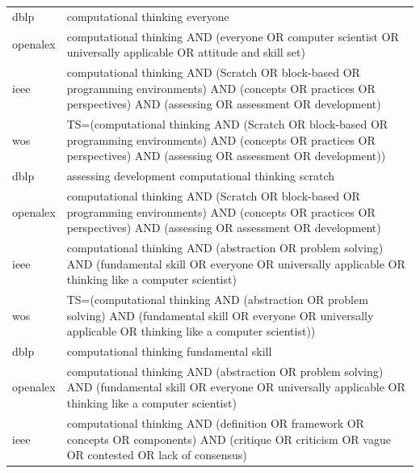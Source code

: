 \documentclass{article}
\begin{document}
\begin{longtable}{lp{10cm}}
dblp & computational thinking everyone \\
openalex & \textquotedbl{}computational thinking\textquotedbl{} AND (everyone OR \textquotedbl{}computer scientist\textquotedbl{} OR \textquotedbl{}universally applicable\textquotedbl{} OR \textquotedbl{}attitude and skill set\textquotedbl{}) \\
ieee & \textquotedbl{}computational thinking\textquotedbl{} AND (Scratch OR \textquotedbl{}block-based\textquotedbl{} OR \textquotedbl{}programming environments\textquotedbl{}) AND (concepts OR practices OR perspectives) AND (assessing OR assessment OR development) \\
wos & TS=(\textquotedbl{}computational thinking\textquotedbl{} AND (Scratch OR \textquotedbl{}block-based\textquotedbl{} OR \textquotedbl{}programming environments\textquotedbl{}) AND (concepts OR practices OR perspectives) AND (assessing OR assessment OR development)) \\
dblp & assessing development computational thinking scratch \\
openalex & \textquotedbl{}computational thinking\textquotedbl{} AND (Scratch OR \textquotedbl{}block-based\textquotedbl{} OR \textquotedbl{}programming environments\textquotedbl{}) AND (concepts OR practices OR perspectives) AND (assessing OR assessment OR development) \\
ieee & \textquotedbl{}computational thinking\textquotedbl{} AND (abstraction OR \textquotedbl{}problem solving\textquotedbl{}) AND (\textquotedbl{}fundamental skill\textquotedbl{} OR everyone OR \textquotedbl{}universally applicable\textquotedbl{} OR \textquotedbl{}thinking like a computer scientist\textquotedbl{}) \\
wos & TS=(\textquotedbl{}computational thinking\textquotedbl{} AND (abstraction OR \textquotedbl{}problem solving\textquotedbl{}) AND (\textquotedbl{}fundamental skill\textquotedbl{} OR everyone OR \textquotedbl{}universally applicable\textquotedbl{} OR \textquotedbl{}thinking like a computer scientist\textquotedbl{})) \\
dblp & computational thinking fundamental skill \\
openalex & \textquotedbl{}computational thinking\textquotedbl{} AND (abstraction OR \textquotedbl{}problem solving\textquotedbl{}) AND (\textquotedbl{}fundamental skill\textquotedbl{} OR everyone OR \textquotedbl{}universally applicable\textquotedbl{} OR \textquotedbl{}thinking like a computer scientist\textquotedbl{}) \\
ieee & \textquotedbl{}computational thinking\textquotedbl{} AND (definition OR framework OR concepts OR components) AND (critique OR criticism OR vague OR contested OR \textquotedbl{}lack of consensus\textquotedbl{}) \\

\end{longtable}
\end{document}

